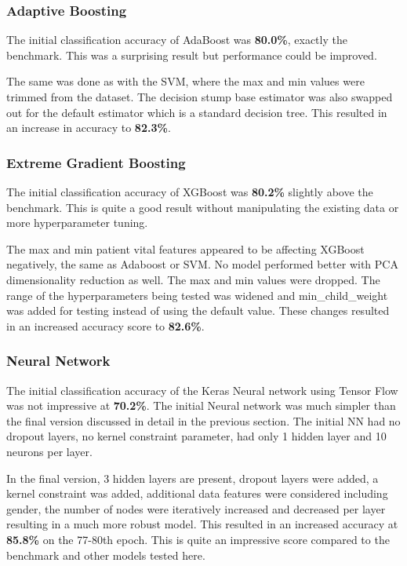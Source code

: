 \documentclass[11pt]{article}
\begin{document}
	\subsubsection{Adaptive Boosting}
	The initial classification accuracy of AdaBoost was \textbf{80.0\%}, exactly the benchmark. This was a surprising result but performance could be improved.
	
	The same was done as with the SVM, where the max and min values were trimmed from the dataset. The decision stump base estimator was also swapped out for the default estimator which is a standard decision tree. This resulted in an increase in accuracy to \textbf{82.3\%}. 
	
	\subsubsection{Extreme Gradient Boosting}
	The initial classification accuracy of XGBoost was \textbf{80.2\%} slightly above the benchmark. This is quite a good result without manipulating the existing data or more hyperparameter tuning.
	
	The max and min patient vital features appeared to be affecting XGBoost negatively, the same as Adaboost or SVM. No model performed better with PCA dimensionality reduction as well. The max and min values were dropped. The range of the hyperparameters being tested was widened and min\_child\_weight was added for testing instead of using the default value. These changes resulted in an increased accuracy score to \textbf{82.6\%}. 
	
	\subsubsection{Neural Network}
    The initial classification accuracy of the Keras Neural network using Tensor Flow was not impressive at \textbf{70.2\%}. The initial Neural network was much simpler than the final version discussed in detail in the previous section. The initial NN had no dropout layers, no kernel constraint parameter, had only 1 hidden layer and 10 neurons per layer.

	In the final version, 3 hidden layers are present, dropout layers were added, a kernel constraint was added, additional data features were considered including gender, the number of nodes were iteratively increased and decreased per layer resulting in a much more robust model. This resulted in an increased accuracy at \textbf{85.8\%} on the 77-80th epoch. This is quite an impressive score compared to the benchmark and other models tested here.
\end{document}
